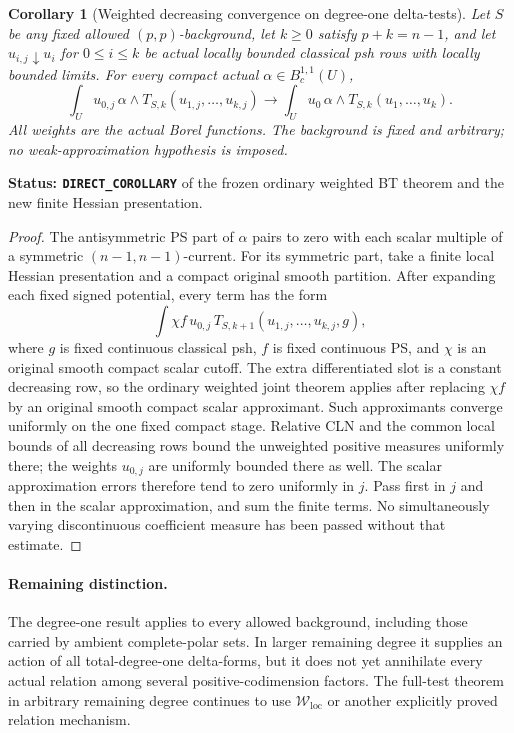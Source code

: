 \documentclass[11pt,a4paper]{article}
\numberwithin{equation}{section}
\newtheorem{corollary}[theorem]{Corollary}
\theoremstyle{definition}
\theoremstyle{remark}
\begin{document}
\begin{corollary}[Weighted decreasing convergence on degree-one delta-tests]
\label{cor:r6-arbitrary-background-degree-one-monotone}
Let $S$ be any fixed allowed $(p,p)$-background, let $k\geq0$ satisfy
$p+k=n-1$, and let $u_{i,j}\downarrow u_i$ for $0\leq i\leq k$
be actual locally bounded classical psh rows with locally bounded
limits.  For every compact actual $\alpha\in B_c^{1,1}(U)$,
\[
 \int_Uu_{0,j}\,\alpha\wedge T_{S,k}(u_{1,j},\ldots,u_{k,j})
       \longrightarrow
 \int_Uu_0\,\alpha\wedge T_{S,k}(u_1,\ldots,u_k).
\]
All weights are the actual Borel functions.  The background is fixed
and arbitrary; no weak-approximation hypothesis is imposed.
\end{corollary}

\noindent\textbf{Status: \texttt{DIRECT\_COROLLARY}} of the frozen
ordinary weighted BT theorem and the new finite Hessian presentation.

\begin{proof}
The antisymmetric PS part of $\alpha$ pairs to zero with each scalar
multiple of a symmetric $(n-1,n-1)$-current.  For its symmetric part,
take a finite local Hessian presentation and a compact original smooth
partition.  After expanding each fixed signed potential, every term
has the form
\[
        \int \chi f\,u_{0,j}\,
                   T_{S,k+1}(u_{1,j},\ldots,u_{k,j},g),
\]
where $g$ is fixed continuous classical psh, $f$ is fixed continuous
PS, and $\chi$ is an original smooth compact scalar cutoff.  The
extra differentiated slot is a constant decreasing row, so the
ordinary weighted joint theorem applies after replacing $\chi f$
by an original smooth compact scalar approximant.  Such approximants
converge uniformly on the one fixed compact stage.  Relative CLN
and the common local bounds of all decreasing rows bound the
unweighted positive measures uniformly there; the weights $u_{0,j}$
are uniformly bounded there as well.  The scalar approximation
errors therefore tend to zero uniformly in $j$.  Pass first in $j$
and then in the scalar approximation, and sum the finite terms.
No simultaneously varying discontinuous coefficient measure has
been passed without that estimate.
\end{proof}

\paragraph{Remaining distinction.}
The degree-one result applies to every allowed background, including
those carried by ambient complete-polar sets.  In larger remaining
degree it supplies an action of all total-degree-one delta-forms,
but it does not yet annihilate every actual relation among several
positive-codimension factors.  The full-test theorem in arbitrary
remaining degree continues to use $\mathcal W_{\mathrm{loc}}$ or
another explicitly proved relation mechanism.
\end{document}
